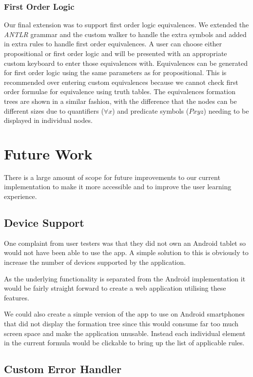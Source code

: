 \documentclass{report}
\begin{document}
\subsubsection{First Order Logic}

Our final extension was to support first order logic equivalences. We extended the \emph{ANTLR} grammar and the custom walker to handle the extra symbols and added in extra rules to handle first order equivalences. A user can choose either propositional or first order logic and will be presented with an appropriate custom keyboard to enter those equivalences with. Equivalences can be generated for first order logic using the same parameters as for propositional. This is recommended over entering custom equivalences because we cannot check first order formulae for equivalence using truth tables. The equivalences formation trees are shown in a similar fashion, with the difference that the nodes can be different sizes due to quantifiers ($\forall x$) and predicate symbols ($Pxyz$) needing to be displayed in individual nodes.

\section{Future Work}

There is a large amount of scope for future improvements to our current implementation to make it more accessible and to improve the user learning experience.

\subsection{Device Support}

One complaint from user testers was that they did not own an Android tablet so would not have been able to use the app. A simple solution to this is obviously to increase the number of devices supported by the application. 

As the underlying functionality is separated from the Android implementation it would be fairly straight forward to create a web application utilising these features. 

We could also create a simple version of the app to use on Android smartphones that did not display the formation tree since this would consume far too much screen space and make the application unusable. Instead each individual element in the current formula would be clickable to bring up the list of applicable rules. 

\subsection{Custom Error Handler}
\end{document}
